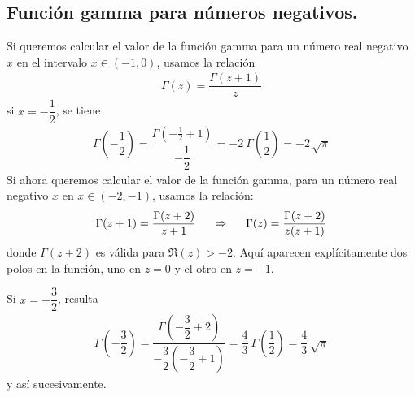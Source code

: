 \subsection{Función gamma para números negativos.}
Si queremos calcular el valor de la función gamma para un número real negativo $x$ en el intervalo $x \in (-1, 0)$, usamos la relación
\begin{align*}
\Gamma (z) = \dfrac{\Gamma (z + 1)}{z}
\end{align*}
si  $x = - \dfrac{1}{2}$, se tiene
\begin{align*}
\Gamma \left( - \dfrac{1}{2} \right) = \dfrac{\Gamma \left( - \frac{1}{2} + 1 \right) }{- \dfrac{1}{2}} =  - 2 \: \Gamma \left( \dfrac{1}{2} \right) = - 2 \, \sqrt{\pi}
\end{align*}
Si ahora queremos calcular el valor de la función gamma, para un número real negativo $x$ en $x \in (-2, -1)$, usamos la relación:
\begin{align*}
\Gamma (z + 1) = \dfrac{\Gamma (z + 2)}{z + 1} \hspace{0.5cm} \Rightarrow \hspace{0.5cm} \Gamma (z) = \dfrac{\Gamma (z + 2)}{z (z + 1)}
\end{align*}
donde $\Gamma (z + 2) $ es válida para $\Re(z) > -2$. Aquí aparecen explícitamente dos polos en la función, uno en $z=0$ y el otro en $z=-1$.
\par
Si $x = - \dfrac{3}{2}$, resulta
\begin{align*}
\Gamma \left( - \dfrac{3}{2} \right) = \dfrac{\Gamma \left( - \dfrac{3}{2} + 2 \right) }{- \dfrac{3}{2} \left( - \dfrac{3}{2} + 1 \right)} =  \dfrac{4}{3} \: \Gamma \left( \dfrac{1}{2} \right) = \dfrac{4}{3} \: \sqrt{\pi}
\end{align*}
y así sucesivamente.
